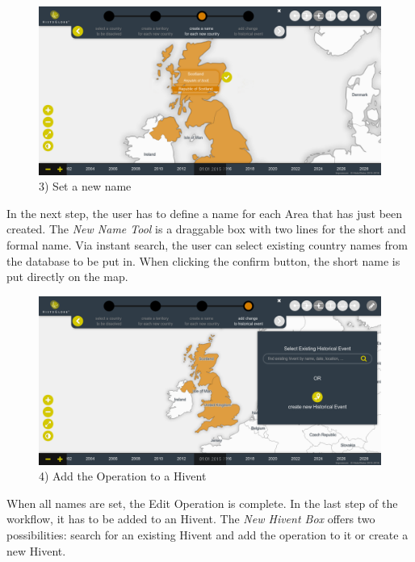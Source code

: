\vspace{1em}
\begin{minipage}[t]{0.47\textwidth}

  \begin{figure}[H]
    \centering
    \includegraphics[width=1.0\textwidth]{graphics/development/user_interface_design_process/5_set_new_name.png}
    \caption{3) Set a new name}
    \label{fig:final_5_set_new_name}
  \end{figure}

  In the next step, the user has to define a name for each Area that has just been created. The \emph{New Name Tool} is a draggable box with two lines for the short and formal name. Via instant search, the user can select existing country names from the database to be put in. When clicking the confirm button, the short name is put directly on the map.

\end{minipage}    %
\hspace{1.5em}    %
\begin{minipage}[t]{0.47\textwidth}

  \begin{figure}[H]
    \centering
    \includegraphics[width=1.0\textwidth]{graphics/development/user_interface_design_process/6_add_change_to_hivent_1.png}
    \caption{4) Add the Operation to a Hivent}
    \label{fig:final_6_add_change_to_hivent_1}
  \end{figure}

  When all names are set, the Edit Operation is complete. In the last step of the workflow, it has to be added to an Hivent. The \emph{New Hivent Box} offers two possibilities: search for an existing Hivent and add the operation to it or create a new Hivent.

\end{minipage}


